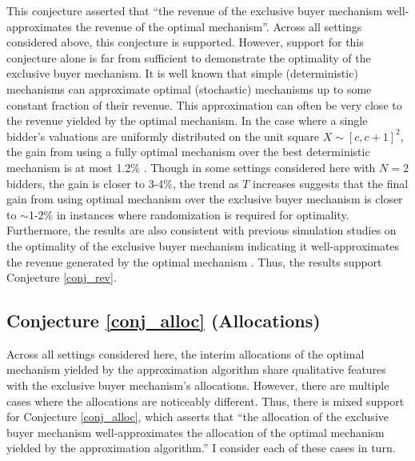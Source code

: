 This conjecture asserted that ``the revenue of the exclusive buyer mechanism well-approximates the revenue of the optimal mechanism''. Across all settings considered above, this conjecture is supported. However, support for this conjecture alone is far from sufficient to demonstrate the optimality of the exclusive buyer mechanism. It is well known that simple (deterministic) mechanisms can approximate optimal (stochastic) mechanisms up to some constant fraction of their revenue. This approximation can often be very close to the revenue yielded by the optimal mechanism. In the case where a single bidder's valuations are uniformly distributed on the unit square $X \sim [c,c+1]^2$, the gain from using a fully optimal mechanism over the best deterministic mechanism is at most 1.2\% \autocite[p11]{pavlov2011optimal}. Though in some settings considered here with $N=2$ bidders, the gain is closer to 3-4\%, the trend as $T$ increases suggests that the final gain from using optimal mechanism over the exclusive buyer mechanism is closer to $\sim$1-2\% in instances where randomization is required for optimality. Furthermore, the results are also consistent with previous simulation studies on the optimality of the exclusive buyer mechanism indicating it well-approximates the revenue generated by the optimal mechanism \autocite{belloni2010multidimensional}. Thus, the results support Conjecture \ref{conj_rev}.

\subsection{Conjecture \ref{conj_alloc} (Allocations)}

Across all settings considered here, the interim allocations of the optimal mechanism yielded by the approximation algorithm share qualitative features with the exclusive buyer mechanism's allocations. However, there are multiple cases where the allocations are noticeably different. Thus, there is mixed support for Conjecture \ref{conj_alloc}, which asserts that ``the allocation of the exclusive buyer mechanism well-approximates the allocation of the optimal mechanism yielded by the approximation algorithm.'' I consider each of these cases in turn.

